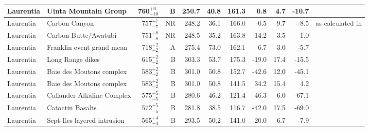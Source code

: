 \documentclass[twocolumn, switch]{article} %
\begin{document}
{\begin{landscape}
\begin{ThreePartTable}
\begin{longtable}{p{1.4 in}p{1.2 in}rrrrrrrrp{1.2 in}}
                     Laurentia &                               Uinta Mountain Group &     760$^{+6}_{-10}$ &      B &     250.7 &      40.8 & 161.3 &   0.8 &       4.7 &       -10.7 &                                   \cite{Weil2006b} \\ \hline
                     Laurentia &                                      Carbon Canyon &      757$^{+7}_{-7}$ &     NR &     248.2 &      36.1 & 166.0 &  -0.5 &       9.7 &        -8.5 &  \cite{Weil2004a} as calculated in \cite{Eyster2020a} \\ \hline
                     Laurentia &                               Carbon Butte/Awatubi &      751$^{+8}_{-8}$ &     NR &     248.5 &      35.2 & 163.8 &  14.2 &       3.5 &         1.0 &                                 \cite{Eyster2020a} \\ \hline
                     Laurentia &                          Franklin event grand mean &      718$^{+2}_{-2}$ &      A &     275.4 &      73.0 & 162.1 &   6.7 &       3.0 &        -5.7 &                               \cite{Denyszyn2009b} \\ \hline
                     Laurentia &                                   Long Range dikes &      615$^{+2}_{-2}$ &      B &     303.3 &      53.7 & 175.3 & -19.0 &      17.4 &       -15.5 &                                 \cite{Murthy1992a} \\ \hline
                     Laurentia &                           Baie des Moutons complex &      583$^{+2}_{-2}$ &      B &     301.0 &      50.8 & 152.7 & -42.6 &      12.0 &       -45.1 &                             \cite{McCausland2011a} \\ \hline
                     Laurentia &                           Baie des Moutons complex &      583$^{+2}_{-2}$ &      B &     301.0 &      50.8 & 141.5 &  34.2 &      15.4 &         4.2 &                             \cite{McCausland2011a} \\ \hline
                     Laurentia &                         Callander Alkaline Complex &      575$^{+5}_{-5}$ &      B &     280.6 &      46.2 & 121.4 & -46.3 &       6.0 &       -67.1 &                                 \cite{Symons1991a} \\ \hline
                     Laurentia &                                   Catoctin Basalts &      572$^{+5}_{-5}$ &      B &     281.8 &      38.5 & 116.7 & -42.0 &      17.5 &       -69.0 &                                  \cite{Meert1994a} \\ \hline
                     Laurentia &                        Sept-Iles layered intrusion &      565$^{+4}_{-4}$ &      B &     293.5 &      50.2 & 141.0 &  20.0 &       6.7 &        -7.9 &                                \cite{Tanczyk1987a} \\ \hline
\end{longtable}
\end{ThreePartTable}
\end{landscape}
}


\end{document}
